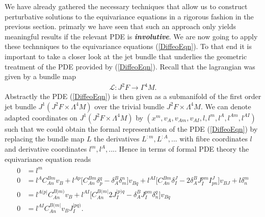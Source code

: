 \documentclass[a4paper,12pt, DIV=14, BCOR=5mm, twoside, headsepline]{scrbook}
\begin{document}
We have already gathered the necessary techniques that allow us to construct perturbative solutions to the equivariance equations in a rigorous fashion in the previous section. primarly we have seen that such an approach only yields meaningful results if the relevant PDE is \textit{\textbf{involutive}}. We are now going to apply these technniques to the equivariance equations (\ref{DiffeoEqn}). To that end it is important to take a closer look at the jet bundle that underlies the  geometric treatment of the PDE provided by (\ref{DiffeoEqn}). Recall that the lagrangian was given by a bundle map 
\begin{align}
\mathcal{L} : J^2F \longrightarrow \Gamma^4M.
\end{align}
Abstractly the PDE (\ref{DiffeoEqn}) is then given as a submanifold of the first order jet bundle $J^1(J^2F \times \Lambda^4M)$ over the trivial bundle $J^2F \times \Lambda^4M$. 
We can denote adapted coordinates on $J^1(J^2F \times \Lambda^4M)$ by $(x^m,v_A,v_{Am},v_{AI},l,l^{m},l^{A},l^{Am},l^{AI})$ such that we could obtain the formal representation of the PDE (\ref{DiffeoEqn}) by replacing the bundle map $L$ the derivatives $L^{:m},L^{:A},...$ with fibre coordinates $l$ and derivative coordinates $l^m,l^A,...$. Hence in terms of formal PDE theory the equivariance equation reads 
\begin{align}\label{DiffeoEqnFormal}
\begin{aligned}
    0 &= l^{m} \\
    0 &= l^{A} C_{An}^{Bm} v_B + l^{Ap} \bigl[ C_{An}^{Bm} \delta_p^q - \delta_A^B \delta_m^n \bigr] v_{Bq} + l^{AI} \bigl[ C_{An}^{Bm} \delta_I^J - 2 \delta_A^B J_I^{pm} I^J_{pn}  \bigr] v_{BJ} + l \delta^m_n \\
    0 &= l^{A(p\vert}C_{An}^{B \vert m)} v_B + l^{ AI} \bigl[ C_{An}^{B(m\vert} 2 J_I^{\vert p) q} - \delta^B_A J_I ^{pm} \delta_n^q \bigr] v_{Bq} \\
    0 &= l^{AI} C_{An}^{B(m\vert} v_B J_I^{\vert p q )}.
    \end{aligned}
\end{align}
\end{document}
